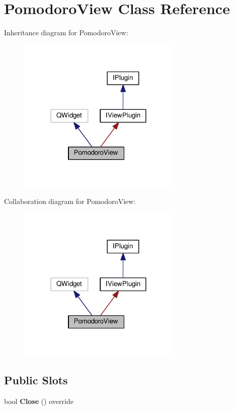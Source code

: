 \hypertarget{class_pomodoro_view}{}\section{Pomodoro\+View Class Reference}
\label{class_pomodoro_view}


Inheritance diagram for Pomodoro\+View\+:\nopagebreak
\begin{figure}[H]
\begin{center}
\leavevmode
\includegraphics[width=221pt]{class_pomodoro_view__inherit__graph}
\end{center}
\end{figure}


Collaboration diagram for Pomodoro\+View\+:\nopagebreak
\begin{figure}[H]
\begin{center}
\leavevmode
\includegraphics[width=221pt]{class_pomodoro_view__coll__graph}
\end{center}
\end{figure}
\subsection*{Public Slots}
\begin{DoxyCompactItemize}
\item 
bool {\bfseries Close} () override\hypertarget{class_pomodoro_view_a250f01540e299dc3777c0e118075461a}{}\label{class_pomodoro_view_a250f01540e299dc3777c0e118075461a}

\end{DoxyCompactItemize}
